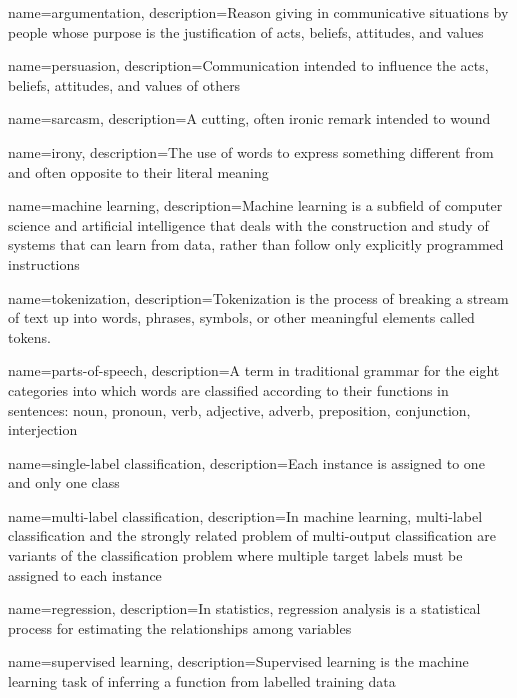 {
	name=argumentation,
	description={Reason giving in communicative situations by people whose purpose is the justification of acts, beliefs, attitudes, and values} 
}

{
	name=persuasion,
	description={Communication intended to influence the acts, beliefs, attitudes, and values of others} 
}

{
	name=sarcasm,
	description={A cutting, often ironic remark intended to wound} 
}

{
	name=irony,
	description={The use of words to express something different from and often opposite to their literal meaning} 
}

{
	name=machine learning,
	description={Machine learning is a subfield of computer science and artificial intelligence that deals with the construction and study of systems that can learn from data, rather than follow only explicitly programmed instructions} 
}

{
	name=tokenization,
	description={Tokenization is the process of breaking a stream of text up into words, phrases, symbols, or other meaningful elements called tokens.} 
}

{
	name=parts-of-speech,
	description={A term in traditional grammar for the eight categories into which words are classified according to their functions in sentences: noun, pronoun, verb, adjective, adverb, preposition, conjunction, interjection}
	}
	
{
	name=single-label classification,
	description={Each instance is assigned to one and only one class}
}

{
	name=multi-label classification,
	description={In machine learning, multi-label classification and the strongly related problem of multi-output classification are variants of the classification problem where multiple target labels must be assigned to each instance}
}

{
	name=regression,
	description={In statistics, regression analysis is a statistical process for estimating the relationships among variables}
}

{
	name=supervised learning,
	description={Supervised learning is the machine learning task of inferring a function from labelled training data} 
}

